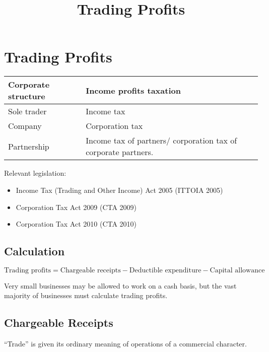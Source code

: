 \documentclass[
]{article}
\title{Trading Profits}
\author{}
\date{}
\providecommand{\tightlist}{%
  \setlength{\itemsep}{0pt}\setlength{\parskip}{0pt}}
\begin{document}
\maketitle

{
\setcounter{tocdepth}{3}
\tableofcontents
}
\hypertarget{trading-profits}{%
\section{Trading Profits}\label{trading-profits}}

\begin{longtable}[]{@{}ll@{}}
\toprule()
Corporate structure & Income profits taxation \\
\midrule()
\endhead
Sole trader & Income tax \\
Company & Corporation tax \\
Partnership & Income tax of partners/ corporation tax of corporate
partners. \\
\bottomrule()
\end{longtable}

Relevant legislation:

\begin{itemize}
\tightlist
\item
  Income Tax (Trading and Other Income) Act 2005 (ITTOIA 2005)
\item
  Corporation Tax Act 2009 (CTA 2009)
\item
  Corporation Tax Act 2010 (CTA 2010)
\end{itemize}

\hypertarget{calculation}{%
\subsection{Calculation}\label{calculation}}

{\(\text{Trading\ profits} = \text{Chargeable\ receipts} - \text{Deductible\ expenditure} - \text{Capital\ allowance}\)}

Very small businesses may be allowed to work on a cash basis, but the
vast majority of businesses must calculate trading profits.

\hypertarget{chargeable-receipts}{%
\subsection{Chargeable Receipts}\label{chargeable-receipts}}

``Trade'' is given its ordinary meaning of operations of a commercial
character.
\end{document}
